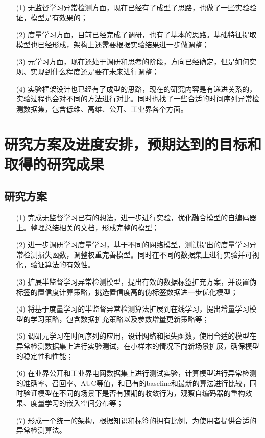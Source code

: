 \begin{itemize}
    \item[(1)] 无监督学习异常检测方面，现在已经有了成型了思路，也做了一些实验验证，模型是有效果的；
    \item[(2)] 度量学习方面，目前已经完成了调研，也有了基本的思路。基础特征提取模型也已经形成，架构上还需要根据实验结果进一步做调整；
    \item[(3)] 元学习方面，现在还处于调研和思考的阶段，方向已经确定，但是如何实现、实现到什么程度还是要在未来进行调整；
    \item[(4)] 实验框架设计也已经有了成型的思路，现在的研究内容是有递进关系的，实验过程也会对不同的方法进行对比。同时也找了一些合适的时间序列异常检测数据集，包含低维、高维、公开、工业界各个方面。
\end{itemize}

\section{研究方案及进度安排，预期达到的目标和取得的研究成果}

\subsection{研究方案}

\begin{itemize}
    \item[(1)] 完成无监督学习已有的想法，进一步进行实验，优化融合模型的自编码器上。整理总结相关的文档，形成完整的模型；
    \item[(2)] 进一步调研学习度量学习，基于不同的网络模型，测试提出的度量学习异常检测损失函数，调整权重完善模型。同时在不同的数据集上进行实验并可视化，验证算法的有效性。
    \item[(3)] 扩展半监督学习异常检测模型，提出有效的数据标签扩充方案，并设置伪标签的置信度计算策略，挑选置信度高的伪标签数据进一步优化模型；
    \item[(4)] 将基于度量学习的半监督异常检测算法扩展到在线学习，提出增量学习模型的学习策略，包含数据扩充策略以及参数增量更新策略等；
    \item[(5)] 调研元学习在时间序列的应用，设计网络和损失函数，使用合适的模型在异常检测数据集上进行实验测试，在小样本的情况下向新场景扩展，确保模型的稳定性和性能；
    \item[(6)] 在业界公开和工业界电网数据集上进行测试实验，计算模型进行异常检测的准确率、召回率、AUC等值，和已有的baseline和最新的算法进行比较，同时验证模型在不同的场景下是否有预期的收敛行为，观察自编码器的重构效果、度量学习的嵌入空间分布等； 
    \item[(7)] 形成一个统一的架构，根据知识和标签的拥有比例，为使用者提供合适的异常检测算法。
\end{itemize}

